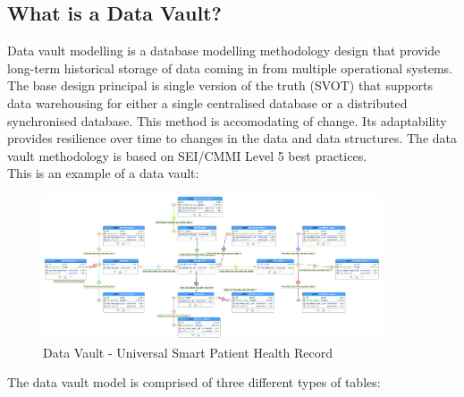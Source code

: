 \subsection{What is a Data Vault?}
\label{sec:datavault}

Data vault modelling is a database modelling methodology design that provide long-term historical storage of data coming in from multiple operational systems.
%
The base design principal is single version of the truth (SVOT) that supports data warehousing for either a single centralised database or a distributed synchronised database. This method is accomodating of change. Its adaptability provides resilience over time to changes in the data and data structures.
%
The data vault methodology is based on SEI/CMMI Level 5 best practices.
\\
\noindent
This is an example of a data vault:

\begin{figure}[H]
    \centering
    \includegraphics[width=10cm]{figures/technical/universal_smart_patient_record.png}
    \caption{Data Vault - Universal Smart Patient Health Record}
    \label{fig:dvlinks}
\end{figure}

The data vault model is comprised of three different types of tables:



